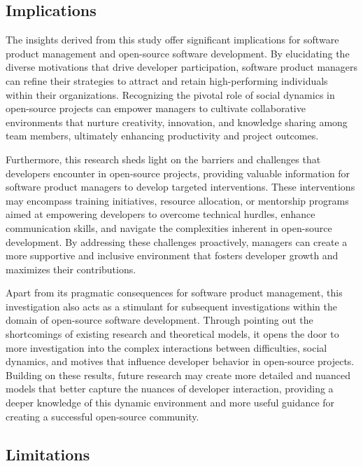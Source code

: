 \subsection{Implications}

The insights derived from this study offer significant implications for software product management and open-source software development. By elucidating the diverse motivations that drive developer participation, software product managers can refine their strategies to attract and retain high-performing individuals within their organizations. Recognizing the pivotal role of social dynamics in open-source projects can empower managers to cultivate collaborative environments that nurture creativity, innovation, and knowledge sharing among team members, ultimately enhancing productivity and project outcomes.

Furthermore, this research sheds light on the barriers and challenges that developers encounter in open-source projects, providing valuable information for software product managers to develop targeted interventions. These interventions may encompass training initiatives, resource allocation, or mentorship programs aimed at empowering developers to overcome technical hurdles, enhance communication skills, and navigate the complexities inherent in open-source development. By addressing these challenges proactively, managers can create a more supportive and inclusive environment that fosters developer growth and maximizes their contributions.

Apart from its pragmatic consequences for software product management, this investigation also acts as a stimulant for subsequent investigations within the domain of open-source software development. Through pointing out the shortcomings of existing research and theoretical models, it opens the door to more investigation into the complex interactions between difficulties, social dynamics, and motives that influence developer behavior in open-source projects. Building on these results, future research may create more detailed and nuanced models that better capture the nuances of developer interaction, providing a deeper knowledge of this dynamic environment and more useful guidance for creating a successful open-source community.



\subsection{Limitations}

